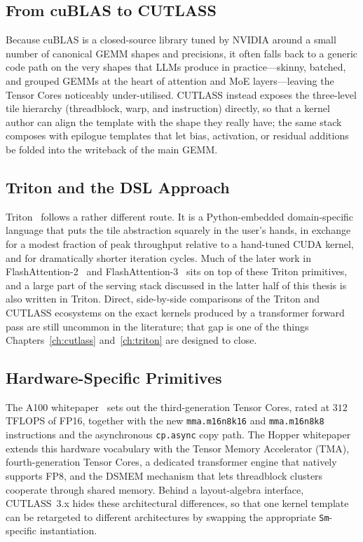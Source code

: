 \subsection{From cuBLAS to CUTLASS}\label{sec:lit_cublas_cutlass}
Because cuBLAS is a closed-source library tuned by NVIDIA around a
small number of canonical GEMM shapes and precisions, it often falls
back to a generic code path on the very shapes that LLMs produce in
practice---skinny, batched, and grouped GEMMs at the heart of
attention and MoE layers---leaving the Tensor Cores noticeably
under-utilised. CUTLASS instead exposes the three-level tile
hierarchy (threadblock, warp, and instruction) directly, so that a
kernel author can align the template with the shape they really
have; the same stack composes with epilogue templates that let bias,
activation, or residual additions be folded into the writeback of
the main GEMM.

\subsection{Triton and the DSL
Approach}\label{sec:lit_triton_dsl}
Triton~\cite{tillet2019triton} follows a rather different route. It
is a Python-embedded domain-specific language that puts the tile
abstraction squarely in the user's hands, in exchange for a modest
fraction of peak throughput relative to a hand-tuned CUDA kernel,
and for dramatically shorter iteration cycles. Much of the later
work in FlashAttention-2~\cite{dao2023flashattention2} and
FlashAttention-3~\cite{dao2024flashattention3} sits on top of these
Triton primitives, and a large part of the serving stack discussed
in the latter half of this thesis is also written in Triton.
Direct, side-by-side comparisons of the Triton and CUTLASS
ecosystems on the exact kernels produced by a transformer forward
pass are still uncommon in the literature; that gap is one of the
things Chapters~\ref{ch:cutlass} and~\ref{ch:triton} are designed
to close.

\subsection{Hardware-Specific Primitives}\label{sec:lit_hw}
The A100 whitepaper~\cite{nvidia_a100} sets out the third-generation
Tensor Cores, rated at $312$\,TFLOPS of FP16, together with the new
\texttt{mma.m16n8k16} and \texttt{mma.m16n8k8} instructions and the
asynchronous \texttt{cp.async} copy path. The Hopper
whitepaper~\cite{nvidia_hopper} extends this hardware vocabulary with
the Tensor Memory Accelerator (TMA), fourth-generation Tensor Cores,
a dedicated transformer engine that natively supports FP8, and the
DSMEM mechanism that lets threadblock clusters cooperate through
shared memory. Behind a layout-algebra interface, CUTLASS~3.x hides
these architectural differences, so that one kernel template can be
retargeted to different architectures by swapping the appropriate
\texttt{Sm}-specific instantiation.

